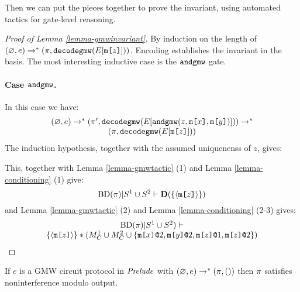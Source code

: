 Then we can put the pieces together to prove the invariant, using automated tactics
for gate-level reasoning.  
\begin{proof}[Proof of Lemma \ref{lemma-gmwinvariant}]
  By induction on the length of $(\varnothing,e) \redxs (\prog,\decodegmw(E[\mesg{z}]))$.
  Encoding establishes the invariant in the basis. The most interesting inductive
  case is the $\andgmw$ gate. 
  \paragraph{Case $\andgmw$.} In this case we have:
  $$
  \begin{array}{c}
  (\varnothing,e) \redxs (\prog',\decodegmw(E[\andgmw(z,\mesg{x},\mesg{y})])) \redxs \\
    (\prog,\decodegmw(E[\mesg{z}]))
  \end{array}
  $$
  The induction hypothesis, together with the assumed uniquenenss of $z$, gives:
  \begin{mathpar}
  

  
  \end{mathpar}
  This, together with Lemma \ref{lemma-gmwtactic} (1) and Lemma \ref{lemma-conditioning} (1)
  give:
  $$
  \conddetx{\progtt(\prog)}{S^1 \cup S^2}{\{ \macgv{\mesg{z}} \}}
  $$
  and Lemma  \ref{lemma-gmwtactic} (2) and Lemma \ref{lemma-conditioning} (2-3) gives:
  $$
  \begin{array}{c}
    \progtt(\prog)|S^1 \cup S^2) \vdash \\
    {\{ \macgv{\mesg{z}} \}} * {(M^1_C \cup M^2_C \cup \{ \elab{\mesg{x}}{2}, \elab{\mesg{y}}{2}, \elab{\mesg{z}}{1}, \elab{\mesg{z}}{2} \})}
  \end{array}
  $$
\end{proof}

\begin{theorem}
  \label{theorem-gmw}
  If $e$ is a GMW circuit protocol in $\metaprot$ with $(\varnothing,e) \redxs (\prog,())$
  then $\prog$ satisfies noninterference modulo output. 
\end{theorem}

